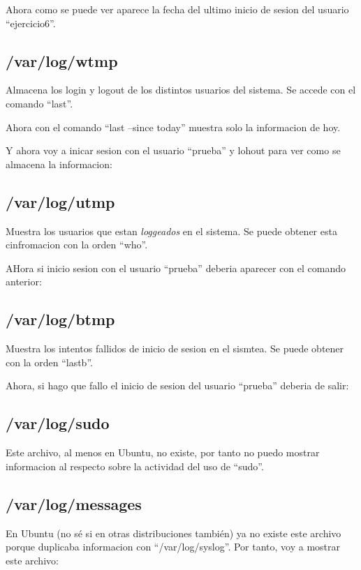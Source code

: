 \documentclass{article}
\begin{document}
Ahora como se puede ver aparece la fecha del ultimo inicio de sesion del usuario ``ejercicio6''.

\subsection{/var/log/wtmp}
Almacena los login y logout de los distintos usuarios del sistema. Se accede con el comando ``last''. 


Ahora con el comando ``last --since today'' muestra solo la informacion de hoy.


Y ahora voy a inicar sesion con el usuario ``prueba'' y lohout para ver como se almacena la informacion:

\subsection{/var/log/utmp}
Muestra los usuarios que estan \textit{loggeados} en el sistema. Se puede obtener esta cinfromacion con la orden ``who''.


AHora si inicio sesion con el usuario ``prueba'' deberia aparecer con el comando anterior:

\subsection{/var/log/btmp}
Muestra los intentos fallidos de inicio de sesion en el sismtea. Se puede obtener con la orden ``lastb''.


Ahora, si hago que fallo el inicio de sesion del usuario ``prueba'' deberia de salir:

\subsection{/var/log/sudo}
Este archivo, al menos en Ubuntu, no existe, por tanto no puedo mostrar informacion al respecto sobre la actividad del uso de ``sudo''.
\subsection{/var/log/messages}
En Ubuntu (no sé si en otras distribuciones también) ya no existe este archivo porque duplicaba informacion con ``/var/log/syslog''. Por tanto, voy a mostrar este archivo:
\end{document}
